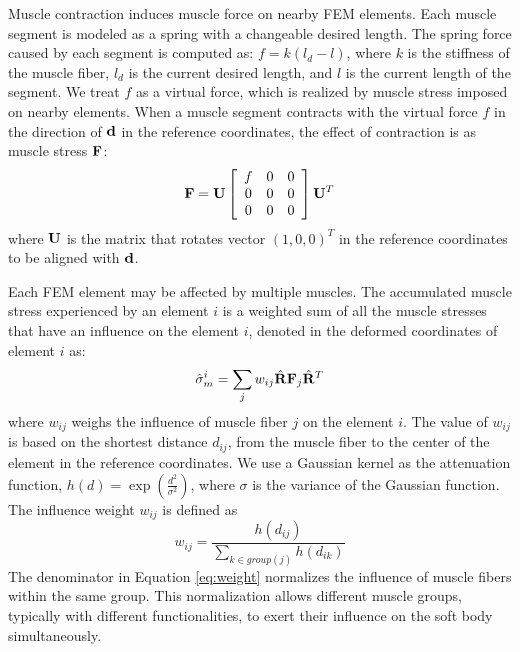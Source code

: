 
Muscle contraction induces muscle force on nearby FEM elements. Each
muscle segment is modeled as a spring with a changeable desired
length. The spring force caused by each segment is computed as: $f =
k(l_d - l)$, where $k$ is the stiffness of the muscle fiber, $l_d$ is
the current desired length, and $l$ is the current length of the
segment. We treat $f$ as a virtual force, which is realized by muscle
stress imposed on nearby elements. When a muscle segment contracts
with the virtual force $f$ in the direction of $\mathbf{d}$ in the
reference coordinates, the effect of contraction is as muscle
stress $\mathbf{F}$:
\begin{equation}
\mathbf{F}=\mathbf{U}\left[\begin{array}{ccc}
f & 0 & 0\\
0 & 0 & 0\\
0 & 0 & 0
\end{array}\right]\mathbf{U}^T
\end{equation}
where $\mathbf{U}$ is the matrix that rotates vector $(1, 0, 0)^T$ in the
reference coordinates to be aligned with $\mathbf{d}$.

Each FEM element may be affected by multiple muscles. The
accumulated muscle stress experienced by an element $i$ is a weighted
sum of all the muscle stresses that have an influence on the element
$i$, denoted in the deformed coordinates of element $i$ as:
\begin{equation}
\hat{\sigma}^i_m=\sum_j w_{ij}\hat{\mathbf{R}}\mathbf{F}_j\hat{\mathbf{R}}^T
\end{equation}
where $w_{ij}$ weighs the influence of muscle fiber $j$ on the element
$i$. The value of $w_{ij}$ is based on the shortest distance
$d_{ij}$, from the muscle fiber to the center of the element in the
reference coordinates. We use a Gaussian kernel as the attenuation
function, $h(d) = \exp(\frac{d^2}{\sigma^2})$, where $\sigma$ is the
variance of the Gaussian function. The influence weight $w_{ij}$ is
defined as
\begin{equation}
w_{ij}=\frac{h(d_{ij})}{\sum_{k\in group(j)}h(d_{ik})}
\label{eq:weight}
\end{equation}
The denominator in Equation \ref{eq:weight} normalizes the influence of
muscle fibers within the same group. This normalization allows
different muscle groups, typically with different functionalities,
to exert their influence on the soft body simultaneously.


